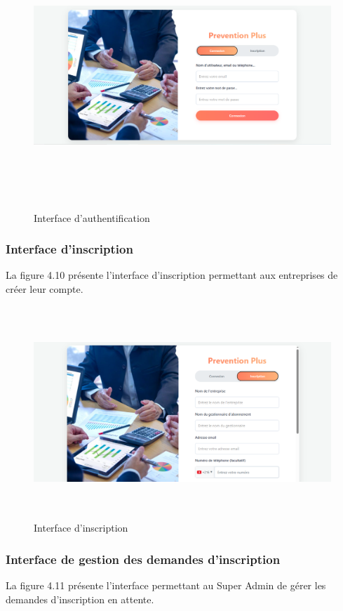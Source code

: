 \begin{figure}[H]
    \centering
    \includegraphics[width=16cm,height=10cm]{images/authpic.PNG}
    \caption{Interface d'authentification}
\end{figure}

\subsubsection{Interface d'inscription}
\noindent La figure 4.10 présente l'interface d'inscription permettant aux entreprises de créer leur compte.

\begin{figure}[H]
    \centering
    \includegraphics[width=15cm,height=8cm]{images/inscpic.PNG}
    \caption{Interface d'inscription}
\end{figure}


\subsubsection{Interface de gestion des demandes d'inscription}
\noindent La figure 4.11 présente l'interface permettant au Super Admin de gérer les demandes d'inscription en attente.

